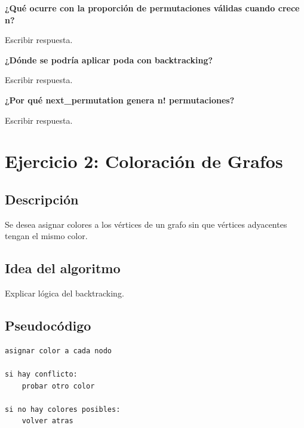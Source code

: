 \documentclass[12pt]{article}
\begin{document}
\textbf{¿Qué ocurre con la proporción de permutaciones válidas cuando crece n?}

\begin{respuesta}

Escribir respuesta.

\end{respuesta}

\textbf{¿Dónde se podría aplicar poda con backtracking?}

\begin{respuesta}

Escribir respuesta.

\end{respuesta}

\textbf{¿Por qué next\_permutation genera n! permutaciones?}

\begin{respuesta}

Escribir respuesta.

\end{respuesta}


\section{Ejercicio 2: Coloración de Grafos}

\subsection{Descripción}

Se desea asignar colores a los vértices de un grafo sin que vértices adyacentes tengan el mismo color.

\subsection{Idea del algoritmo}

\begin{respuesta}

Explicar lógica del backtracking.

\end{respuesta}

\subsection{Pseudocódigo}

\begin{verbatim}
asignar color a cada nodo

si hay conflicto:
    probar otro color

si no hay colores posibles:
    volver atras
\end{verbatim}
\end{document}
